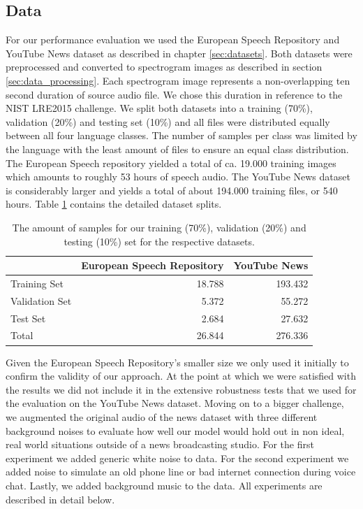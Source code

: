 \subsection{Data} 
\label{sec:data}
	For our performance evaluation we used the European Speech Repository and YouTube News dataset as described in chapter \ref{sec:datasets}. Both datasets were preprocessed and converted to spectrogram images as described in section \ref{sec:data_processing}. Each spectrogram image represents a non-overlapping ten second duration of source audio file. We chose this duration in reference to the NIST LRE2015 challenge\cite{lre2015}.	We split both datasets into a training (70\%), validation (20\%) and testing set (10\%) and all files were distributed equally between all four language classes. The number of samples per class was limited by the language with the least amount of files to ensure an equal class distribution. The European Speech repository yielded a total of ca. 19.000 training images  which amounts to roughly 53 hours of speech audio. The YouTube News dataset is considerably larger and yields a total of about 194.000 training files, or 540 hours. Table \ref{tab:data_splits} contains the detailed dataset splits.

	\begin{table}[]
	\centering
	\begin{tabularx}{\textwidth}{lrr}
	\toprule
	  				& European Speech Repository & YouTube News\\ \midrule
	Training Set    & 18.788						 & 193.432 \\
	Validation Set  & 5.372						 & 55.272 \\
	Test Set        & 2.684						 & 27.632 \\
	\midrule
	Total           & 26.844						 & 276.336 \\
	\bottomrule
	\end{tabularx}
	\caption{The amount of samples for our training (70\%), validation (20\%) and testing (10\%) set for the respective datasets.}
	\label{tab:data_splits}
	\end{table}

	Given the European Speech Repository's smaller size we only used it initially to confirm the validity of our approach. At the point at which we were satisfied with the results we did not include it in the extensive robustness tests that we used for the evaluation on the YouTube News dataset. Moving on to a bigger challenge, we augmented the original audio of the news dataset with three different background noises to evaluate how well our model would hold out in non ideal, real world situations outside of a news broadcasting studio. For the first experiment we added generic white noise to data. For the second experiment we added noise to simulate an old phone line or bad internet connection during voice chat. Lastly, we added background music to the data. All experiments are described in detail below.


